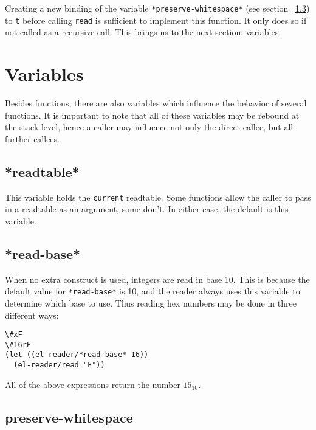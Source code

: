 \documentclass[a4paper,10pt,twoside]{report}
\newcommand{\sym}[1]{\texttt{#1}}
\newcommand{\fun}[1]{\texttt{#1}}
\newcommand{\Read}{\fun{read}}
\newcommand{\tee}{\sym{t}}
\begin{document}
Creating a new binding of the variable \sym{*preserve-whitespace*} (see section
~\ref{subsec:preserve-whitespace}) to \tee{} before calling \Read{} is sufficient
to implement this function.  It only does so if not called as a recursive call.
This brings us to the next section: variables.

\section{Variables}
\label{sec:variables}

Besides functions, there are also variables which influence the behavior of
several functions.  It is important to note that all of these variables may be
rebound at the stack level, hence a caller may influence not only the direct
callee, but all further callees.

\subsection{*readtable*}
\label{subsec:readtable-var}

This variable holds the \texttt{current} readtable.  Some functions allow the
caller to pass in a readtable as an argument, some don’t.  In either case, the
default is this variable.

\subsection{*read-base*}
\label{subsec:read-base}

When no extra construct is used, integers are read in base 10.  This is because
the default value for \sym{*read-base*} is 10, and the reader always uses this
variable to determine which base to use.  Thus reading hex numbers may be done
in three different ways:

\begin{lstlisting}[style=lispinline]
\#xF
\#16rF
(let ((el-reader/*read-base* 16))
  (el-reader/read "F"))
\end{lstlisting}

All of the above expressions return the number \(15_{10}\).

\subsection{preserve-whitespace}
\label{subsec:preserve-whitespace}
\end{document}
